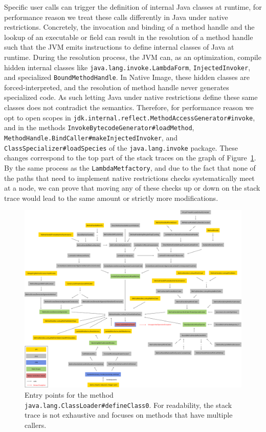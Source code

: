 Specific user calls can trigger the definition of internal Java classes at runtime, for performance reason we treat these calls differently in Java under native restrictions.
Concretely, the invocation and binding of a method handle and the lookup of an executable or field can result in the resolution of a method handle such that the JVM emits instructions to define internal classes of Java at runtime. During the resolution process, the JVM can, as an optimization, compile hidden internal classes like \verb|java.lang.invoke.LambdaForm|, \verb|InjectedInvoker|, and specialized \verb|BoundMethodHandle|.
In Native Image, these hidden classes are forced-interpreted, and the resolution of method handle never generates specialized code. As such letting Java under native restrictions define these same classes does not contradict the semantics. Therefore, for performance reason we opt to open scopes in \verb|jdk.internal.reflect.MethodAccessGenerator#invoke|, and in the methods \verb|InvokeBytecodeGenerator#loadMethod|, \verb|MethodHandle.BindCaller#makeInjectedInvoker|, and \verb|ClassSpecializer#loadSpecies| of the \verb|java.lang.invoke| package. These changes correspond to the top part of the stack traces on the graph of Figure~\ref{fig:define_class_0}. By the same process as the \verb|LambdaMetfactory|, and due to the fact that none of the paths that need to implement native restrictions checks systematically meet at a node, we can prove that moving any of these checks up or down on the stack trace would lead to the same amount or strictly more modifications.

\begin{figure}
    \centering
    \includegraphics[angle=90,origin=c,scale=0.35]{resources/Group 409.png}
    \caption{Entry points for the method \texttt{java.lang.ClassLoader\#defineClass0}. For readability, the stack trace is not exhaustive and focuses on methods that have multiple callers.}
    \label{fig:define_class_0}
\end{figure}


